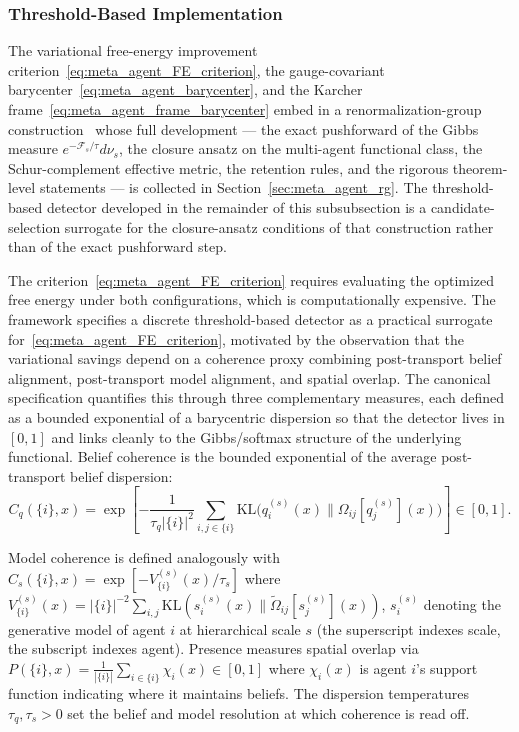 \documentclass[11pt]{article}
\begin{document}
\subsubsection{Threshold-Based Implementation}
\label{sec:meta_agent_threshold}

The variational free-energy improvement criterion~\eqref{eq:meta_agent_FE_criterion}, the gauge-covariant barycenter~\eqref{eq:meta_agent_barycenter}, and the Karcher frame~\eqref{eq:meta_agent_frame_barycenter} embed in a renormalization-group construction~\cite{Wilson1971, Cardy1996} whose full development — the exact pushforward of the Gibbs measure $e^{-\mathcal{F}_s/\tau} d\nu_s$, the closure ansatz on the multi-agent functional class, the Schur-complement effective metric, the retention rules, and the rigorous theorem-level statements — is collected in Section~\ref{sec:meta_agent_rg}. The threshold-based detector developed in the remainder of this subsubsection is a candidate-selection surrogate for the closure-ansatz conditions of that construction rather than of the exact pushforward step.

The criterion~\eqref{eq:meta_agent_FE_criterion} requires evaluating the optimized free energy under both configurations, which is computationally expensive. The framework specifies a discrete threshold-based detector as a practical surrogate for~\eqref{eq:meta_agent_FE_criterion}, motivated by the observation that the variational savings depend on a coherence proxy combining post-transport belief alignment, post-transport model alignment, and spatial overlap. The canonical specification quantifies this through three complementary measures, each defined as a bounded exponential of a barycentric dispersion so that the detector lives in $[0, 1]$ and links cleanly to the Gibbs/softmax structure of the underlying functional. Belief coherence is the bounded exponential of the average post-transport belief dispersion:
\begin{equation}
C_q(\{i\}, x) = \exp\left[-\frac{1}{\tau_q |\{i\}|^2}\sum_{i,j \in \{i\}} \mathrm{KL}\big(q_i^{(s)}(x) \| \Omega_{ij}[q_j^{(s)}](x)\big)\right] \in [0, 1].
\end{equation}

Model coherence is defined analogously with $C_s(\{i\}, x) = \exp[-V^{(s)}_{\{i\}}(x)/\tau_s]$ where $V^{(s)}_{\{i\}}(x) = |\{i\}|^{-2}\sum_{i,j} \mathrm{KL}(s_i^{(s)}(x) \| \tilde{\Omega}_{ij}[s_j^{(s)}](x))$, $s_i^{(s)}$ denoting the generative model of agent $i$ at hierarchical scale $s$ (the superscript indexes scale, the subscript indexes agent). Presence measures spatial overlap via $P(\{i\}, x) = \frac{1}{|\{i\}|}\sum_{i \in \{i\}} \chi_i(x) \in [0, 1]$ where $\chi_i(x)$ is agent $i$'s support function indicating where it maintains beliefs. The dispersion temperatures $\tau_q, \tau_s > 0$ set the belief and model resolution at which coherence is read off.
\end{document}
